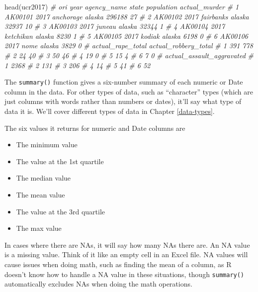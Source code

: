 \documentclass[
  a4paper,
]{krantz}
\makeatletter
\newenvironment{Shaded}{\begin{snugshade}}{\end{snugshade}}
\newcommand{\CommentTok}[1]{\textcolor[rgb]{0.37,0.37,0.37}{\textit{#1}}}
\newcommand{\FunctionTok}[1]{\textcolor[rgb]{0,0,0}{#1}}
\newcommand{\NormalTok}[1]{#1}
\providecommand{\tightlist}{%
  \setlength{\itemsep}{0pt}\setlength{\parskip}{0pt}}
\newenvironment{kframe}{%
\medskip{}
\setlength{\fboxsep}{.8em}
 \def\at@end@of@kframe{}%
 \ifinner\ifhmode%
  \def\at@end@of@kframe{\end{minipage}}%
  \begin{minipage}{\columnwidth}%
 \fi\fi%
 \def\FrameCommand##1{\hskip\@totalleftmargin \hskip-\fboxsep
 \colorbox{shadecolor}{##1}\hskip-\fboxsep
     \hskip-\linewidth \hskip-\@totalleftmargin \hskip\columnwidth}%
 \MakeFramed {\advance\hsize-\width
   \@totalleftmargin\z@ \linewidth\hsize
   \@setminipage}}%
 {\par\unskip\endMakeFramed%
 \at@end@of@kframe}
\renewenvironment{Shaded}{\begin{kframe}}{\end{kframe}}
\makeatother
\begin{document}
\begin{Shaded}
\begin{Highlighting}[]
\FunctionTok{head}\NormalTok{(ucr2017)}
\CommentTok{\#       ori year agency\_name  state population actual\_murder}
\CommentTok{\# 1 AK00101 2017   anchorage alaska     296188            27}
\CommentTok{\# 2 AK00102 2017   fairbanks alaska      32937            10}
\CommentTok{\# 3 AK00103 2017      juneau alaska      32344             1}
\CommentTok{\# 4 AK00104 2017   ketchikan alaska       8230             1}
\CommentTok{\# 5 AK00105 2017      kodiak alaska       6198             0}
\CommentTok{\# 6 AK00106 2017        nome alaska       3829             0}
\CommentTok{\#   actual\_rape\_total actual\_robbery\_total}
\CommentTok{\# 1               391                  778}
\CommentTok{\# 2                24                   40}
\CommentTok{\# 3                50                   46}
\CommentTok{\# 4                19                    0}
\CommentTok{\# 5                15                    4}
\CommentTok{\# 6                 7                    0}
\CommentTok{\#   actual\_assault\_aggravated}
\CommentTok{\# 1                      2368}
\CommentTok{\# 2                       131}
\CommentTok{\# 3                       206}
\CommentTok{\# 4                        14}
\CommentTok{\# 5                        41}
\CommentTok{\# 6                        52}
\end{Highlighting}
\end{Shaded}

The \texttt{summary()} function gives a six-number summary
of each numeric or Date column in the data. For other types
of data, such as ``character'' types (which are just columns
with words rather than numbers or dates), it'll say what
type of data it is. We'll cover different types of data in
Chapter \ref{data-types}.

The six values it returns for numeric and Date columns are

\begin{itemize}
\tightlist
\item
  The minimum value
\item
  The value at the 1st quartile
\item
  The median value
\item
  The mean value
\item
  The value at the 3rd quartile
\item
  The max value
\end{itemize}

In cases where there are NAs, it will say how many NAs there
are. An NA value is a missing value. Think of it like an
empty cell in an Excel file. NA values will cause issues
when doing math, such as finding the mean of a column, as R
doesn't know how to handle a NA value in these situations,
though \texttt{summary()} automatically excludes NAs when
doing the math operations.
\end{document}
